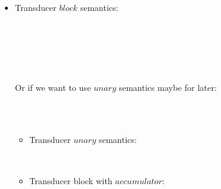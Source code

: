 \begin{itemize}
\item Transducer $block$ semantics: \\ 


 \\

 \\[1ex]

\\[1ex]

\\[1ex]


\\[1ex]

Or if we want to use $unary$ semantics maybe for later: \\
\begin{mdframed}
\\[2ex]

\\[2ex]

\begin{itemize}
\item Transducer $unary$ semantics:\\ 


\PT{ \Axiom{\usum(\oF) \dda \vunit}}
\PT{\Axiom{\usum(\oT) \dda \emptyv }} \\[1ex]


\item Transducer block with $accumulator$: \\


\end{itemize}
\end{mdframed}
\end{itemize}
